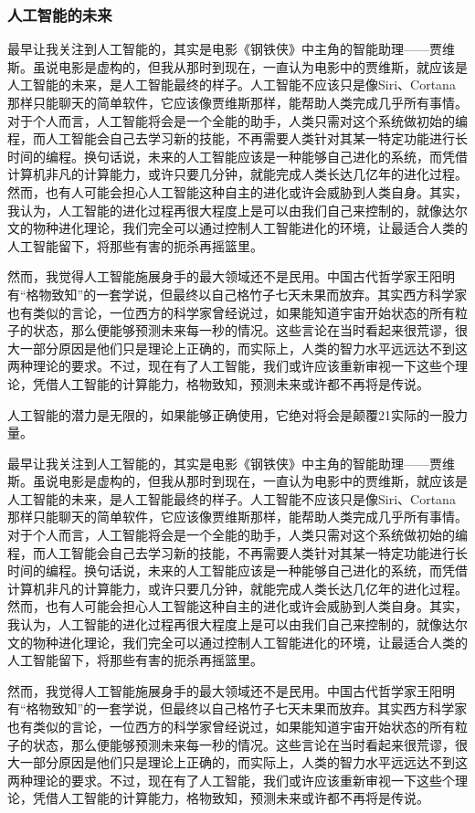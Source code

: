 \documentclass[UTF8]{XJTUthesis}
\begin{document}
\subsubsection{人工智能的未来}
最早让我关注到人工智能的，其实是电影《钢铁侠》中主角的智能助理——贾维斯。虽说电影是虚构的，但我从那时到现在，一直认为电影中的贾维斯，就应该是人工智能的未来，是人工智能最终的样子。人工智能不应该只是像Siri、Cortana那样只能聊天的简单软件，它应该像贾维斯那样，能帮助人类完成几乎所有事情。对于个人而言，人工智能将会是一个全能的助手，人类只需对这个系统做初始的编程，而人工智能会自己去学习新的技能，不再需要人类针对其某一特定功能进行长时间的编程。换句话说，未来的人工智能应该是一种能够自己进化的系统，而凭借计算机非凡的计算能力，或许只要几分钟，就能完成人类长达几亿年的进化过程。然而，也有人可能会担心人工智能这种自主的进化或许会威胁到人类自身。其实，我认为，人工智能的进化过程再很大程度上是可以由我们自己来控制的，就像达尔文的物种进化理论，我们完全可以通过控制人工智能进化的环境，让最适合人类的人工智能留下，将那些有害的扼杀再摇篮里。\par
然而，我觉得人工智能施展身手的最大领域还不是民用。中国古代哲学家王阳明有“格物致知”的一套学说，但最终以自己格竹子七天未果而放弃。其实西方科学家也有类似的言论，一位西方的科学家曾经说过，如果能知道宇宙开始状态的所有粒子的状态，那么便能够预测未来每一秒的情况。这些言论在当时看起来很荒谬，很大一部分原因是他们只是理论上正确的，而实际上，人类的智力水平远远达不到这两种理论的要求。不过，现在有了人工智能，我们或许应该重新审视一下这些个理论，凭借人工智能的计算能力，格物致知，预测未来或许都不再将是传说。\par
人工智能的潜力是无限的，如果能够正确使用，它绝对将会是颠覆21实际的一股力量。\par
最早让我关注到人工智能的，其实是电影《钢铁侠》中主角的智能助理——贾维斯。虽说电影是虚构的，但我从那时到现在，一直认为电影中的贾维斯，就应该是人工智能的未来，是人工智能最终的样子。人工智能不应该只是像Siri、Cortana那样只能聊天的简单软件，它应该像贾维斯那样，能帮助人类完成几乎所有事情。对于个人而言，人工智能将会是一个全能的助手，人类只需对这个系统做初始的编程，而人工智能会自己去学习新的技能，不再需要人类针对其某一特定功能进行长时间的编程。换句话说，未来的人工智能应该是一种能够自己进化的系统，而凭借计算机非凡的计算能力，或许只要几分钟，就能完成人类长达几亿年的进化过程。然而，也有人可能会担心人工智能这种自主的进化或许会威胁到人类自身。其实，我认为，人工智能的进化过程再很大程度上是可以由我们自己来控制的，就像达尔文的物种进化理论，我们完全可以通过控制人工智能进化的环境，让最适合人类的人工智能留下，将那些有害的扼杀再摇篮里。\par
然而，我觉得人工智能施展身手的最大领域还不是民用。中国古代哲学家王阳明有“格物致知”的一套学说，但最终以自己格竹子七天未果而放弃。其实西方科学家也有类似的言论，一位西方的科学家曾经说过，如果能知道宇宙开始状态的所有粒子的状态，那么便能够预测未来每一秒的情况。这些言论在当时看起来很荒谬，很大一部分原因是他们只是理论上正确的，而实际上，人类的智力水平远远达不到这两种理论的要求。不过，现在有了人工智能，我们或许应该重新审视一下这些个理论，凭借人工智能的计算能力，格物致知，预测未来或许都不再将是传说。\par
\end{document}
